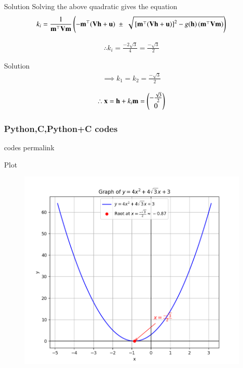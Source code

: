 \documentclass{beamer}
\begin{document}
\begin{frame}{Solution}
Solving the above quadratic gives the equation
\begin{align}
k_i = \frac{1}{\mathbf{m}^{\top}\mathbf{V}\mathbf{m}}
\left(
    -\mathbf{m}^{\top} (\mathbf{V}\mathbf{h} + \mathbf{u})
    \;\pm\;
    \sqrt{ {}\left[\mathbf{m}^{\top}(\mathbf{V}\mathbf{h} + \mathbf{u})\right]^2
    - g(\mathbf{h}) \, (\mathbf{m}^{\top}\mathbf{V}\mathbf{m}) }
    \right)
\end{align}

\begin{align}
\therefore k_i = \frac{-2\sqrt{3}}{4} = \frac{-\sqrt{3}}{2}
\end{align}
\end{frame}

\begin{frame}{Solution}
\begin{align}
\implies k_1 = k_2 = \frac{-\sqrt{3}}{2}
\end{align}

\begin{align}
\therefore \mathbf{x} = \mathbf{h} + k_i\mathbf{m} = \begin{pmatrix}-\frac{\sqrt{3}}{2} \\ 0\end{pmatrix}
\end{align}
\end{frame}

\begin{frame}[fragile]
\frametitle{Python,C,Python+C codes}
codes permalink
\end{frame}

\begin{frame}{Plot}
\begin{figure}[h!]
    \centering
    \includegraphics[height=0.5\textheight, keepaspectratio]{figs/fig.png}
    \label{figure_9_4_18}
\end{figure}
\end{frame}
\end{document}
